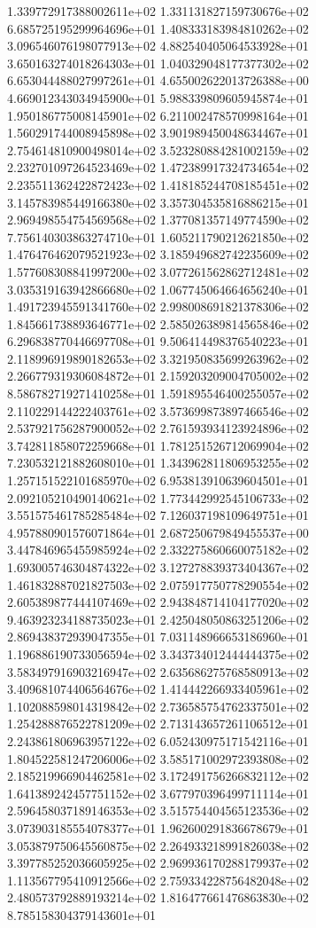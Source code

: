 1.339772917388002611e+02 1.331131827159730676e+02 6.685725195299964696e+01
1.408333183984810262e+02 3.096546076198077913e+02 4.882540405064533928e+01
3.650163274018264303e+01 1.040329048177377302e+02 6.653044488027997261e+01
4.655002622013726388e+00 4.669012343034945900e+01 5.988339809605945874e+01
1.950186775008145901e+02 6.211002478570998164e+01 1.560291744008945898e+02
3.901989450048634467e+01 2.754614810900498014e+02 3.523280884281002159e+02
2.232701097264523469e+02 1.472389917324734654e+02 2.235511362422872423e+02
1.418185244708185451e+02 3.145783985449166380e+02 3.357304535816886215e+01
2.969498554754569568e+02 1.377081357149774590e+02 7.756140303863274710e+01
1.605211790212621850e+02 1.476476462079521923e+02 3.185949682742235609e+02
1.577608308841997200e+02 3.077261562862712481e+02 3.035319163942866680e+02
1.067745064664656240e+01 1.491723945591341760e+02 2.998008691821378306e+02
1.845661738893646771e+02 2.585026389814565846e+02 6.296838770446697708e+01
9.506414498376540223e+01 2.118996919890182653e+02 3.321950835699263962e+02
2.266779319306084872e+01 2.159203209004705002e+02 8.586782719271410258e+01
1.591895546400255057e+02 2.110229144222403761e+02 3.573699873897466546e+02
2.537921756287900052e+02 2.761593934123924896e+02 3.742811858072259668e+01
1.781251526712069904e+02 7.230532121882608010e+01 1.343962811806953255e+02
1.257151522101685970e+02 6.953813910639604501e+01 2.092105210490140621e+02
1.773442992545106733e+02 3.551575461785285484e+02 7.126037198109649751e+01
4.957880901576071864e+01 2.687250679849455537e+00 3.447846965455985924e+02
2.332275860660075182e+02 1.693005746304874322e+02 3.127278839373404367e+02
1.461832887021827503e+02 2.075917750778290554e+02 2.605389877444107469e+02
2.943848714104177020e+02 9.463923234188735023e+01 2.425048050863251206e+02
2.869438372939047355e+01 7.031148966653186960e+01 1.196886190733056594e+02
3.343734012444444375e+02 3.583497916903216947e+02 2.635686275768580913e+02
3.409681074406564676e+02 1.414442266933405961e+02 1.102088598014319842e+02
2.736585754762337501e+02 1.254288876522781209e+02 2.713143657261106512e+01
2.243861806963957122e+02 6.052430975171542116e+01 1.804522581247206006e+02
3.585171002972393808e+02 2.185219966904462581e+02 3.172491756266832112e+02
1.641389242457751152e+02 3.677970396499711114e+01 2.596458037189146353e+02
3.515754404565123536e+02 3.073903185554078377e+01 1.962600291836678679e+01
3.053879750645560875e+02 2.264933218991826038e+02 3.397785252036605925e+02
2.969936170288179937e+02 1.113567795410912566e+02 2.759334228756482048e+02
2.480573792889193214e+02 1.816477661476863830e+02 8.785158304379143601e+01
